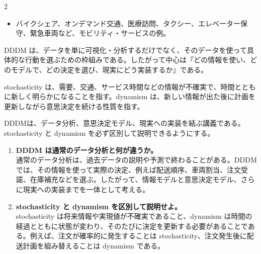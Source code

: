 \vspace{1.5mm}

\begin{multicols}{2}

\footnotesize

\raggedcolumns


\begin{itemize}
\item バイクシェア、オンデマンド交通、医療訪問、タクシー、エレベーター保守、緊急車両など、モビリティ・サービスの例。
\end{itemize}

DDDM は、データを単に可視化・分析するだけでなく、そのデータを使って具体的な行動を選ぶための枠組みである。したがって中心は『どの情報を使い、どのモデルで、どの決定を選び、現実にどう実装するか』である。\par

stochasticity は、需要、交通、サービス時間などの情報が不確実で、時間とともに新しく明らかになることを指す。dynamism は、新しい情報が出た後に計画を更新しながら意思決定を続ける性質を指す。\par

DDDMは、データ分析、意思決定モデル、現実への実装を結ぶ講義である。stochasticity と dynamism を必ず区別して説明できるようにする。\par

\begin{enumerate}
\item \textbf{DDDM は通常のデータ分析と何が違うか。}\\
通常のデータ分析は、過去データの説明や予測で終わることがある。DDDMでは、その情報を使って実際の決定、例えば配送順序、車両割当、注文受諾、在庫補充などを選ぶ。したがって、情報モデルと意思決定モデル、さらに現実への実装までを一体として考える。
\item \textbf{stochasticity と dynamism を区別して説明せよ。}\\
stochasticity は将来情報や実現値が不確実であること、dynamism は時間の経過とともに状態が変わり、そのたびに決定を更新する必要があることである。例えば、注文が確率的に発生することは stochasticity、注文発生後に配送計画を組み替えることは dynamism である。
\end{enumerate}

\end{multicols}

\clearpage


